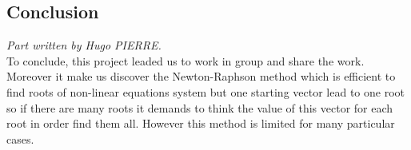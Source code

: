 \documentclass{article}
\begin{document}
\subsection{Conclusion}
\textit{Part written by Hugo PIERRE.}\\

To conclude, this project leaded us to work in group and share the work. Moreover it make us discover the Newton-Raphson method which is efficient to find roots of non-linear equations system but one starting vector lead to one root so if there are many roots it demands to think the value of this vector for each root in order find them all. However this method is limited for many particular cases.
\end{document}
